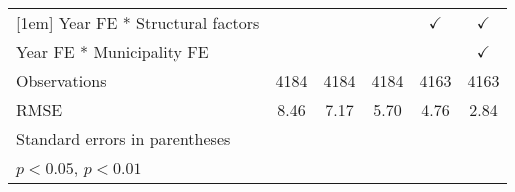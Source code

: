 \begin{table}[htbp]
\begin{tabular}{l*{5}{c}}
[1em]
Year FE * Structural factors&                    &                    &                    &$\checkmark$        &$\checkmark$        \\
[1em]
Year FE * Municipality FE&                    &                    &                    &                    &$\checkmark$        \\
\hline
Observations        &        4184        &        4184        &        4184        &        4163        &        4163        \\
RMSE                &        8.46        &        7.17        &        5.70        &        4.76        &        2.84        \\
\hline\hline
\multicolumn{6}{l}{\footnotesize Standard errors in parentheses}\\
\multicolumn{6}{l}{\footnotesize \sym{*} \(p<0.05\), \sym{**} \(p<0.01\)}\\
\end{tabular}
\end{table}
